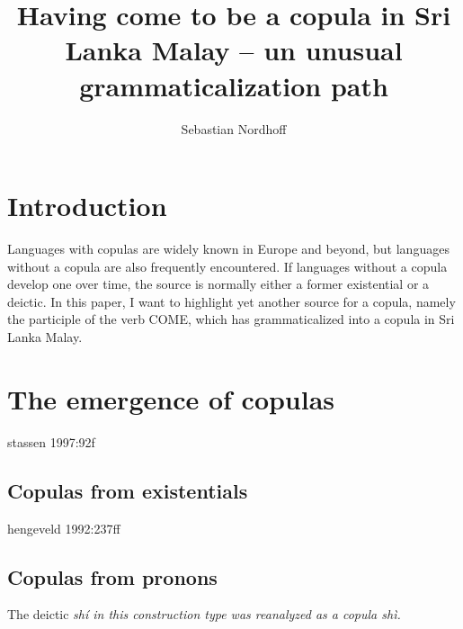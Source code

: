 \documentclass[a4paper,12pt]{article}
\title{Having come to be a copula in Sri Lanka Malay -- un unusual grammaticalization path}
\author{Sebastian Nordhoff}
\begin{document}
\maketitle

\begin{abstract}

\end{abstract}

\section{Introduction}
Languages with copulas are widely known in Europe and beyond, but languages without a copula are also frequently encountered. If languages without a copula develop one over time, the source is normally either a former existential or a deictic. In this paper, I want to highlight yet another source for a copula, namely the participle of the verb COME, which has grammaticalized into a copula in Sri Lanka Malay.


\section{The emergence of copulas}
stassen 1997:92f
\subsection{Copulas from existentials}

hengeveld 1992:237ff

\subsection{Copulas from pronons}


The deictic \em shí \em in this  construction type was reanalyzed as a copula \em shì\em.



\end{document}

